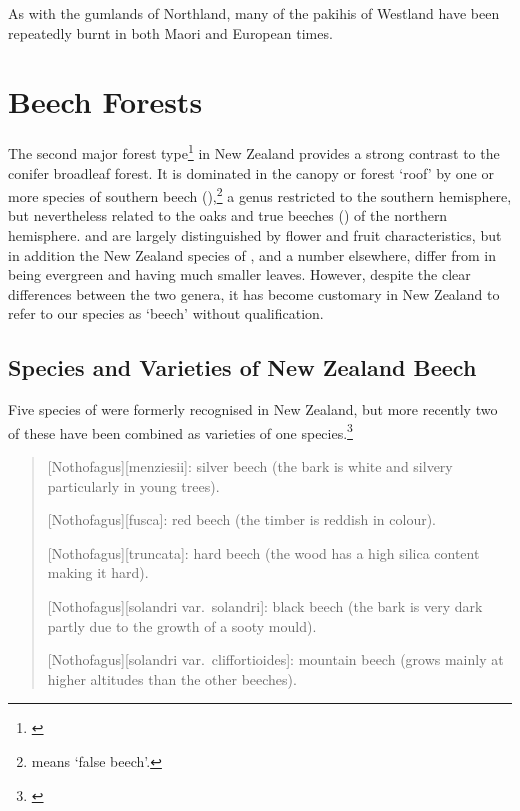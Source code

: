 As with the gumlands of Northland, many of the pakihis of Westland have been repeatedly burnt in both Maori and European times.

\chapter{Beech Forests}

The second major forest type\footnote{\cite{wardle1984beeches}} in New Zealand provides a strong contrast to the conifer broadleaf forest.
It is dominated in the canopy or forest `roof' by one or more species of southern beech (),\footnote{ means `false beech'.} a genus restricted to the southern hemisphere, but nevertheless related to the oaks and true beeches () of the northern hemisphere.  and  are largely distinguished by flower and fruit characteristics, but in addition the New Zealand species of , and a number elsewhere, differ from  in being evergreen and having much smaller leaves.
However, despite the clear differences between the two genera, it has become customary in New Zealand to refer to our species as `beech' without qualification.

\section{Species and Varieties of New Zealand Beech}

Five species of  were formerly recognised in New Zealand, but more recently two of these have been combined as varieties of one species.\footnote{\cite{poole1958studies}}

\begin{quote}
	[Nothofagus][menziesii]: silver beech (the bark is white and silvery particularly in young trees).

	[Nothofagus][fusca]: red beech (the timber is reddish in colour).

	[Nothofagus][truncata]: hard beech (the wood has a high silica content making it hard).

	[Nothofagus][solandri var.\ solandri]: black beech (the bark is very dark partly due to the growth of a sooty mould).

	[Nothofagus][solandri var.\ cliffortioides]: mountain beech (grows mainly at higher altitudes than the other beeches).
\end{quote}

